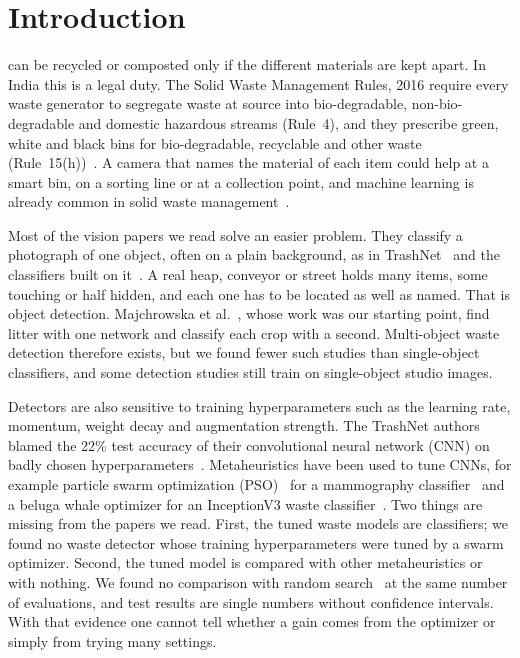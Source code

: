 \section{Introduction}
\label{sec:intro}

 can be recycled or composted only if the different materials are kept apart. In India this is a legal duty. The Solid Waste Management Rules, 2016 require every waste generator to segregate waste at source into bio-degradable, non-bio-degradable and domestic hazardous streams (Rule~4), and they prescribe green, white and black bins for bio-degradable, recyclable and other waste (Rule~15(h))~\cite{moefcc2016solid}. A camera that names the material of each item could help at a smart bin, on a sorting line or at a collection point, and machine learning is already common in solid waste management~\cite{abdallah2020artificial,fang2023artificial}.

Most of the vision papers we read solve an easier problem. They classify a photograph of one object, often on a plain background, as in TrashNet~\cite{yang2016classification} and the classifiers built on it~\cite{kaya2023classification}. A real heap, conveyor or street holds many items, some touching or half hidden, and each one has to be located as well as named. That is object detection. Majchrowska et al.~\cite{majchrowska2022deep}, whose work was our starting point, find litter with one network and classify each crop with a second. Multi-object waste detection therefore exists, but we found fewer such studies than single-object classifiers, and some detection studies still train on single-object studio images.

Detectors are also sensitive to training hyperparameters such as the learning rate, momentum, weight decay and augmentation strength. The TrashNet authors blamed the 22\% test accuracy of their convolutional neural network (CNN) on badly chosen hyperparameters~\cite{yang2016classification}. Metaheuristics have been used to tune CNNs, for example particle swarm optimization (PSO)~\cite{kennedy1995particle} for a mammography classifier~\cite{aguerchi2024cnn} and a beluga whale optimizer for an InceptionV3 waste classifier~\cite{sayed2024intelligent}. Two things are missing from the papers we read. First, the tuned waste models are classifiers; we found no waste detector whose training hyperparameters were tuned by a swarm optimizer. Second, the tuned model is compared with other metaheuristics or with nothing. We found no comparison with random search~\cite{bergstra2012random} at the same number of evaluations, and test results are single numbers without confidence intervals. With that evidence one cannot tell whether a gain comes from the optimizer or simply from trying many settings.

